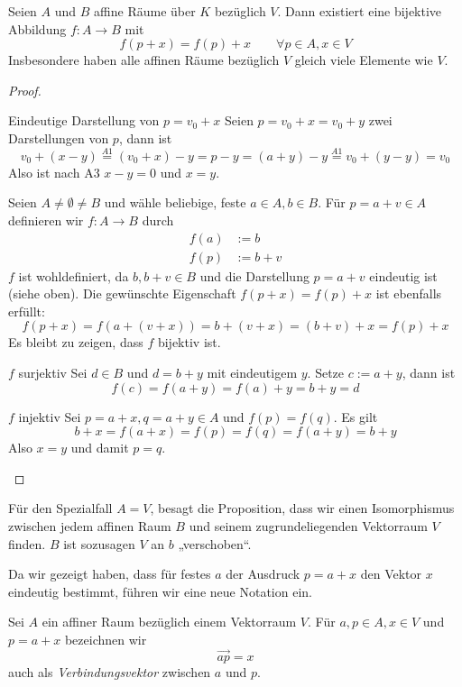 \documentclass{mycourse}
\begin{document}
\begin{prop} 
	\label{prop:8.4}
Seien $A$ und $B$ affine Räume über $K$ bezüglich $V$.
Dann existiert eine bijektive Abbildung $f:A\rightarrow B$ mit 
\[
	f(p+x) = f(p)+x \qquad \forall p\in A, x\in V
\]
Insbesondere haben alle affinen Räume bezüglich $V$ gleich viele Elemente wie $V$.
\begin{proof}
	\begin{seg}{Eindeutige Darstellung von $p=v_0+x$}
		Seien $p=v_0+x=v_0+y$ zwei Darstellungen von $p$, dann ist
		\[
			v_0+(x-y) \stackrel{A1}= (v_0+x)-y = p-y = (a+y)-y \stackrel{A1}= v_0+(y-y) = v_0
		\]
		Also ist nach A3 $x-y=0$ und $x=y$.
	\end{seg}
	Seien $A\neq \emptyset \neq B$ und wähle beliebige, feste $a\in A, b\in B$.
	Für $p=a+v\in A$ definieren wir $f:A\to B$ durch
	\begin{align*}
		f(a) &:= b\\
		f(p) &:= b +v
	\end{align*}
	$f$ ist wohldefiniert, da $b,b+v\in B$ und die Darstellung $p=a+v$ eindeutig ist (siehe oben).
	Die gewünschte Eigenschaft $f(p+x)=f(p)+x$ ist ebenfalls erfüllt:
	\[
		f(p+x) = f(a+(v+x)) = b + (v+x) = (b+v)+x = f(p) + x
	\]
	Es bleibt zu zeigen, dass $f$ bijektiv ist.

	\begin{seg}{$f$ surjektiv}
		Sei $d\in B$ und $d=b+y$ mit eindeutigem $y$.
		Setze $c := a+y$, dann ist
		\[
			f(c) = f(a+y) = f(a)+y = b+y = d
		\]
	\end{seg}
	\begin{seg}{$f$ injektiv}
		Sei $p=a+x,q=a+y\in A$ und $f(p)=f(q)$.
		Es gilt
		\[
			b + x = f(a+x) = f(p) = f(q) = f(a+y) = b+y
		\]
		Also $x=y$ und damit $p=q$.
	\end{seg}
\end{proof}
\begin{note}
	Für den Spezialfall $A=V$, besagt die Proposition, dass wir einen Isomorphismus zwischen jedem affinen Raum $B$ und seinem zugrundeliegenden Vektorraum $V$ finden.
	$B$ ist sozusagen $V$ an $b$ „verschoben“.
\end{note}
\end{prop}

Da wir gezeigt haben, dass für festes $a$ der Ausdruck $p=a+x$ den Vektor $x$ eindeutig bestimmt, führen wir eine neue Notation ein.

\begin{df*}
	Sei $A$ ein affiner Raum bezüglich einem Vektorraum $V$.
	Für $a,p\in A, x\in V$ und $p=a+x$ bezeichnen wir
	\[
		\vec{ap} = x
	\]
	auch als \emph{Verbindungsvektor} zwischen $a$ und $p$.
\end{df*}
\end{document}
